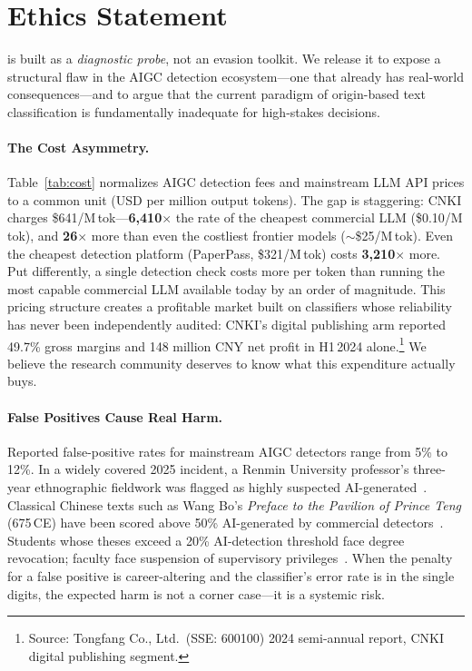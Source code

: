 \section*{Ethics Statement}
\label{sec:ethics}

\styleshield{} is built as a \emph{diagnostic probe}, not an evasion toolkit.
We release it to expose a structural flaw in the AIGC detection ecosystem---one that already has real-world consequences---and to argue that the current paradigm of origin-based text classification is fundamentally inadequate for high-stakes decisions.

\paragraph{The Cost Asymmetry.}
Table~\ref{tab:cost} normalizes AIGC detection fees and mainstream LLM API prices to a common unit (USD per million output tokens).
The gap is staggering: CNKI charges \$641/M\,tok---\textbf{6{,}410$\times$} the rate of the cheapest commercial LLM (\$0.10/M\,tok), and \textbf{26$\times$} more than even the costliest frontier models (${\sim}$\$25/M\,tok).
Even the cheapest detection platform (PaperPass, \$321/M\,tok) costs \textbf{3{,}210$\times$} more.
Put differently, a single detection check costs more per token than running the most capable commercial LLM available today by an order of magnitude.
This pricing structure creates a profitable market built on classifiers whose reliability has never been independently audited: CNKI's digital publishing arm reported 49.7\% gross margins and 148 million CNY net profit in H1\,2024 alone.\footnote{Source: Tongfang Co., Ltd.\ (SSE: 600100) 2024 semi-annual report, CNKI digital publishing segment.}
We believe the research community deserves to know what this expenditure actually buys.



\paragraph{False Positives Cause Real Harm.}
Reported false-positive rates for mainstream AIGC detectors range from 5\% to 12\%.
In a widely covered 2025 incident, a Renmin University professor's three-year ethnographic fieldwork was flagged as highly suspected AI-generated~\cite{sun2025aigc}.
Classical Chinese texts such as Wang Bo's \emph{Preface to the Pavilion of Prince Teng} (675\,CE) have been scored above 50\% AI-generated by commercial detectors~\cite{sun2025aigc}.
Students whose theses exceed a 20\% AI-detection threshold face degree revocation; faculty face suspension of supervisory privileges~\cite{restofworld2025aigc}.
When the penalty for a false positive is career-altering and the classifier's error rate is in the single digits, the expected harm is not a corner case---it is a systemic risk.

